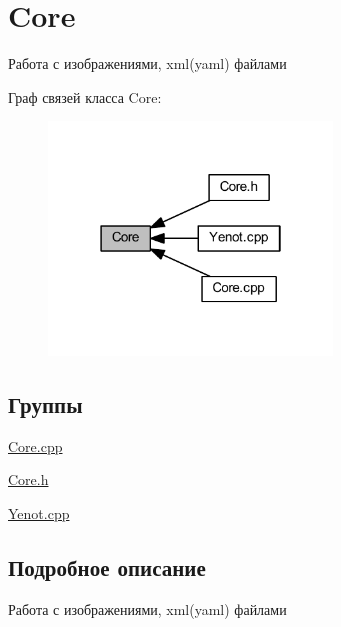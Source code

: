 \hypertarget{group__core}{}\section{Core}
\label{group__core}


Работа с изображениями, xml(yaml) файлами  


Граф связей класса Core\+:
\nopagebreak
\begin{figure}[H]
\begin{center}
\leavevmode
\includegraphics[width=214pt]{group__core}
\end{center}
\end{figure}
\subsection*{Группы}
\begin{DoxyCompactItemize}
\item 
\mbox{\hyperlink{group__corecpp}{Core.\+cpp}}
\item 
\mbox{\hyperlink{group__coreh}{Core.\+h}}
\item 
\mbox{\hyperlink{group__yenotcpp}{Yenot.\+cpp}}
\end{DoxyCompactItemize}


\subsection{Подробное описание}
Работа с изображениями, xml(yaml) файлами 


